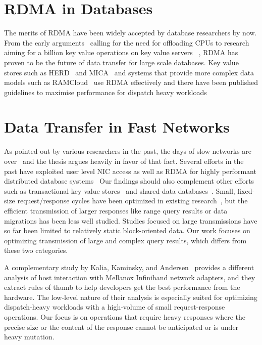 \section{RDMA in Databases}
The merits of RDMA have been widely accepted by database researchers by now. From
the early arguments~\cite{rdmacase} calling for the need for offloading CPUs to 
research aiming for a billion key value operations on key value servers ~\cite{rdmabillion},
RDMA has proven to be the future of data transfer for large scale databases. Key value stores
such as HERD~\cite{herd} and MICA~\cite{mica} and systems that provide more complex
data models such as RAMCloud~\cite{ramcloud} use RDMA effectively and there have been 
published guidelines to maximise performance for dispatch heavy workloads~\cite{rdma}

\section{Data Transfer in Fast Networks}
As pointed out by various researchers in the past, the days of slow networks are over~\cite{slow}
and the thesis argues heavily in favor of that fact. Several efforts in the past have exploited
user level NIC access as well as RDMA for highly performant distributed database systems~\cite{ramcloud,farm,farmtx,drtm,hyper}
Our findings should also complement other efforts such as transactional key value stores~\cite{deuteronomy} 
and shared-data databases~\cite{tell}. Small, fixed-size request/response cycles have been optimized in
existing research~\cite{farm,herd,mica,rdma,ramcloud}, but the efficient
transmission of larger responses like range query results or data
migrations has been less well studied. Studies focused on large transmissions
have so far been limited to relatively static block-oriented data.
Our work focuses on optimizing transmission of large and complex query
results, which differs from these two categories.

A complementary study by Kalia, Kaminsky, and Andersen~\cite{rdma} provides a
different analysis of host interaction with Mellanox Infiniband network adapters,
and they extract rules of thumb to help developers get the best performance from the hardware.
The low-level nature of their analysis is especially suited for
optimizing dispatch-heavy workloads with a high-volume of small
request-response operations. Our focus is on operations that require heavy
responses where the precise size or the content of the response cannot be anticipated or is
under heavy mutation.